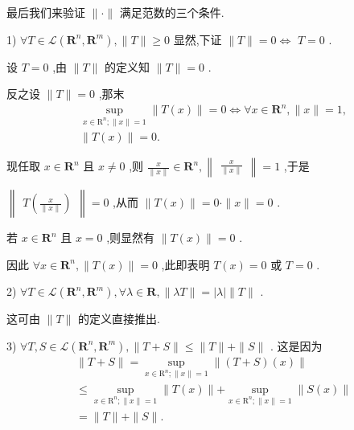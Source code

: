 最后我们来验证 $\parallel  \cdot  \parallel$ 满足范数的三个条件.

1) $\forall T \in  \mathcal{L}\left( {{\mathbf{R}}^{n},{\mathbf{R}}^{m}}\right) ,\parallel T\parallel  \geq  0$ 显然,下证 $\parallel T\parallel  = 0 \Leftrightarrow$  $T = 0$ .

设 $T = 0$ ,由 $\parallel T\parallel$ 的定义知 $\parallel T\parallel  = 0$ .

反之设 $\parallel T\parallel  = 0$ ,那末
\begin{align*}
	&\mathop{\sup }\limits_{{x \in  {\mathrm{R}}^{n};\parallel x\parallel  = 1}}\parallel T\left( x\right) \parallel  = 0 \Leftrightarrow  \forall x \in  {\mathbf{R}}^{n},\parallel x\parallel  = 1,\\
	&\parallel T\left( x\right) \parallel  = 0.
\end{align*}

现任取 $x \in  {\mathbf{R}}^{n}$ 且 $x \neq  0$ ,则 $\frac{x}{\parallel x\parallel } \in  {\mathbf{R}}^{n},\begin{Vmatrix}\frac{x}{\parallel x\parallel }\end{Vmatrix} = 1$ ,于是

$\begin{Vmatrix}{T\left( \frac{x}{\parallel x\parallel }\right) }\end{Vmatrix} = 0$ ,从而 $\parallel T\left( x\right) \parallel  = 0 \cdot  \parallel x\parallel  = 0$ .

若 $x \in  {\mathbf{R}}^{n}$ 且 $x = 0$ ,则显然有 $\parallel T\left( x\right) \parallel  = 0$ .

因此 $\forall x \in  {\mathbf{R}}^{n},\parallel T\left( x\right) \parallel  = 0$ ,此即表明 $T\left( x\right)  = 0$ 或 $T = 0$ .

2) $\forall T \in  \mathcal{L}\left( {{\mathbf{R}}^{n},{\mathbf{R}}^{m}}\right) ,\forall \lambda  \in  \mathbf{R},\parallel {\lambda T}\parallel  = \left| \lambda \right| \parallel T\parallel$ .

这可由 $\parallel T\parallel$ 的定义直接推出.

3) $\forall T,S \in  \mathcal{L}\left( {{\mathbf{R}}^{n},{\mathbf{R}}^{m}}\right) ,\parallel T + S\parallel  \leq  \parallel T\parallel  + \parallel S\parallel$ . 这是因为
\begin{align*}
	&\parallel T + S\parallel  = \mathop{\sup }\limits_{{x \in  {\mathrm{R}}^{n};\parallel x\parallel  = 1}}\parallel \left( {T + S}\right) \left( x\right) \parallel\\
	&\leq  \mathop{\sup }\limits_{{x \in  {\mathrm{R}}^{n};\parallel x\parallel  = 1}}\parallel T\left( x\right) \parallel  + \mathop{\sup }\limits_{{x \in  {\mathrm{R}}^{n};\parallel x\parallel  = 1}}\parallel S\left( x\right) \parallel\\
	&= \parallel T\parallel  + \parallel S\parallel .
\end{align*}

